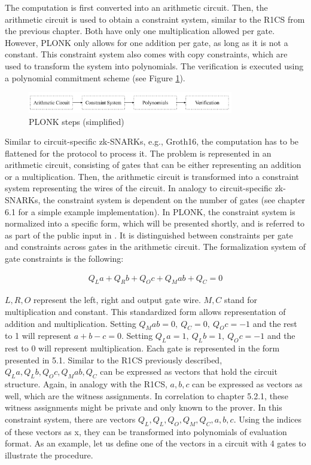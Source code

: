 The computation is first converted into an arithmetic circuit. Then, the arithmetic circuit is used to obtain a constraint system, similar to the R1CS from the previous chapter. Both have only one multiplication allowed per gate. However, PLONK only allows for one addition per gate, as long as it is not a constant. This constraint system also comes with copy constraints, which are used to transform the system into polynomials. The verification is executed using a polynomial commitment scheme (see Figure \ref{fig:plonk}).

\begin{figure}[hbt]
	\centering
		\includegraphics[width=0.8\textwidth]{Pictures/plonk_process.png}
	\caption{PLONK steps (simplified)}
	\label{fig:plonk}
\end{figure}

Similar to circuit-specific zk-SNARKs, e.g., Groth16, the computation has to be flattened for the protocol to process it. The problem is represented in an arithmetic circuit, consisting of gates that can be either representing an addition or a multiplication. Then, the arithmetic circuit is transformed into a constraint system representing the wires of the circuit. In analogy to circuit-specific zk-SNARKs, the constraint system is dependent on the number of gates (see chapter 6.1 for a simple example implementation). In PLONK, the constraint system is normalized into a specific form, which will be presented shortly, and is referred to as part of the public input in \citet{PLONKcryptoeprint:2019/953}. 
It is distinguished between constraints per gate and constraints across gates in the arithmetic circuit. The formalization system of gate constraints is the following:

\begin{align}
    Q_{L}a + Q_{R}b + Q_{O}c + Q_{M}ab + Q_C = 0
\end{align}

\(L, R, O\) represent the left, right and output gate wire. \(M, C\) stand for multiplication and constant. This standardized form allows representation of addition and multiplication. Setting \(Q_{M}ab = 0, \ Q_C=0, \ Q_{O}c = -1 \) and the rest to 1 will represent \(a + b - c = 0\). Setting \(Q_{L}a =1,\ Q_{L}b =1,\ Q_{O}c = -1\) and the rest to 0 will represent multiplication. Each gate is represented in the form presented in 5.1. Similar to the R1CS previously described, \(Q_{L}a, Q_{L}b, Q_{O}c, Q_{M}ab, Q_C\) can be expressed as vectors that hold the circuit structure. Again, in analogy with the R1CS, \(a, b, c\) can be expressed as vectors as well, which are the witness assignments. In correlation to chapter 5.2.1, these witness assignments might be private and only known to the prover.
In this constraint system, there are vectors \(Q_{L}, Q_{L}, Q_{O}, Q_{M}, Q_C, a, b, c\). Using the indices of these vectors as x, they can be transformed into polynomials of evaluation format. As an example, let us define one of the vectors in a circuit with 4 gates to illustrate the procedure. 

